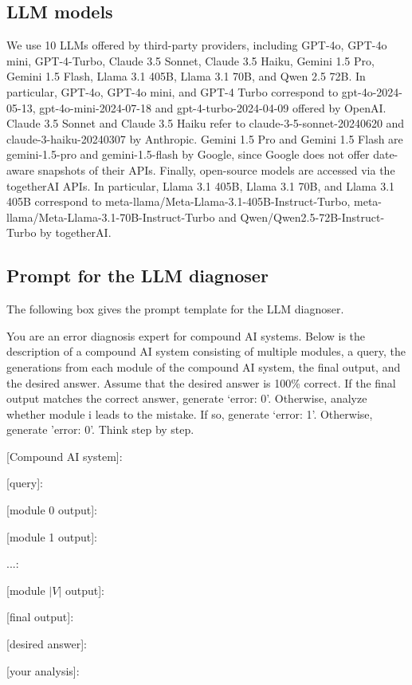 \subsection{LLM models}
We use 10 LLMs offered by third-party providers,  including GPT-4o, GPT-4o mini, GPT-4-Turbo, Claude 3.5 Sonnet, Claude 3.5 Haiku, Gemini 1.5 Pro, Gemini 1.5 Flash, Llama 3.1 405B, Llama 3.1 70B, and Qwen 2.5 72B. In particular, GPT-4o, GPT-4o mini, and GPT-4 Turbo correspond to gpt-4o-2024-05-13, gpt-4o-mini-2024-07-18 and gpt-4-turbo-2024-04-09 offered by OpenAI. Claude 3.5 Sonnet and Claude 3.5 Haiku refer to claude-3-5-sonnet-20240620 and claude-3-haiku-20240307 by Anthropic. Gemini 1.5 Pro and Gemini 1.5 Flash are gemini-1.5-pro and gemini-1.5-flash by Google, since Google does not offer date-aware snapshots of their APIs.  Finally, open-source models are accessed via the togetherAI APIs. In particular, 
Llama 3.1 405B, Llama 3.1 70B, and Llama 3.1 405B correspond to meta-llama/Meta-Llama-3.1-405B-Instruct-Turbo, meta-llama/Meta-Llama-3.1-70B-Instruct-Turbo and Qwen/Qwen2.5-72B-Instruct-Turbo by togetherAI.
              
\subsection{Prompt for the LLM diagnoser}
The following box gives the prompt template for the LLM diagnoser.

\begin{LLMdiagnoser}

 You are an error diagnosis expert for compound AI systems. Below is the description of a compound AI system consisting of multiple modules, a query, the generations from each module of the compound AI system, the final output, and the desired answer. Assume that the desired answer is 100\% correct. If the final output matches the correct answer, generate ‘error: 0’. Otherwise, analyze whether module i leads to the mistake. If so, generate ‘error: 1’. Otherwise, generate ’error: 0’. Think step by step.


[Compound AI system]:

[query]:

[module 0 output]:

[module 1 output]:

...:

[module $|V|$ output]: 

[final output]:

[desired answer]:

[your analysis]: 
\end{LLMdiagnoser}

